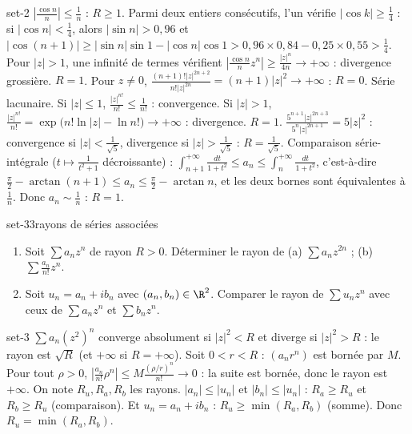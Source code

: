 \begin{corrige}{set-2}
 $\left|\frac{\cos n}n\right|\leq\frac1n$ : $R\geq1$. Parmi deux entiers consécutifs, l'un vérifie $|\cos k|\geq\frac14$ : si $|\cos n|<\frac14$, alors
$|\sin n|>0{,}96$ et $|\cos(n+1)|\geq|\sin n|\sin1-|\cos n|\cos1>0{,}96\times0{,}84-0{,}25\times0{,}55>\frac14$. Pour $|z|>1$, une infinité de
termes vérifient $\left|\frac{\cos n}nz^n\right|\geq\frac{|z|^n}{4n}\to+\infty$ : divergence grossière. $R=1$.
 Pour $z\neq0$, $\frac{(n+1)!|z|^{2n+2}}{n!|z|^{2n}}=(n+1)|z|^2\to+\infty$ : $R=0$.
 Série lacunaire. Si $|z|\leq1$, $\frac{|z|^{n!}}{n!}\leq\frac1{n!}$ : convergence. Si $|z|>1$, $\frac{|z|^{n!}}{n!}=\exp\big(n!\ln|z|-\ln n!\big)\to+\infty$ :
divergence. $R=1$.
 $\frac{5^{n+1}|z|^{2n+3}}{5^n|z|^{2n+1}}=5|z|^2$ : convergence si $|z|<\frac1{\sqrt5}$, divergence si $|z|>\frac1{\sqrt5}$ : $R=\frac1{\sqrt5}$.
 Comparaison série-intégrale ($t\mapsto\frac1{t^2+1}$ décroissante) : $\int_{n+1}^{+\infty}\frac{dt}{1+t^2}\leq a_n\leq\int_n^{+\infty}\frac{dt}{1+t^2}$, c'est-à-dire
$\frac\pi2-\arctan(n+1)\leq a_n\leq\frac\pi2-\arctan n$, et les deux bornes sont équivalentes à $\frac1n$. Donc $a_n\sim\frac1n$ : $R=1$.
\end{corrige}

\begin{exo}{set-3}{3}{rayons de séries associées}
\begin{enumerate}
\item Soit $\sum a_nz^n$ de rayon $R>0$. Déterminer le rayon de (a) $\sum a_nz^{2n}$ ; (b) $\sum\frac{a_n}{n!}z^n$.
\item Soit $u_n=a_n+ib_n$ avec $(a_n,b_n)\in\R^2$. Comparer le rayon de $\sum u_nz^n$ avec ceux de $\sum a_nz^n$ et $\sum b_nz^n$.
\end{enumerate}
\end{exo}

\begin{corrige}{set-3}
 $\sum a_n(z^2)^n$ converge absolument si $|z|^2<R$ et diverge si $|z|^2>R$ : le rayon est $\sqrt R$ (et $+\infty$ si $R=+\infty$).
 Soit $0<r<R$ : $(a_nr^n)$ est bornée par $M$. Pour tout $\rho>0$, $\left|\frac{a_n}{n!}\rho^n\right|\leq M\frac{(\rho/r)^n}{n!}\to0$ : la suite est bornée,
donc le rayon est $+\infty$.
 On note $R_u,R_a,R_b$ les rayons. $|a_n|\leq|u_n|$ et $|b_n|\leq|u_n|$ : $R_a\geq R_u$ et $R_b\geq R_u$ (comparaison). Et $u_n=a_n+ib_n$ :
$R_u\geq\min(R_a,R_b)$ (somme). Donc $R_u=\min(R_a,R_b)$.
\end{corrige}

